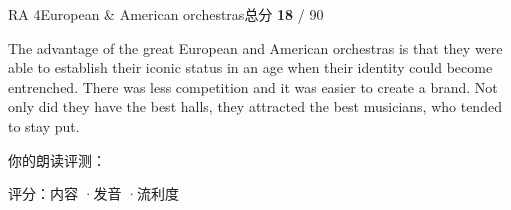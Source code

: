 \begin{qblock}{RA 4\quad European \& American orchestras}{总分 \textcolor{cAccent}{\bfseries 18} / 90}
\begin{promptbox}
The advantage of the great European and American orchestras is that they were able to establish their iconic status in an age when their identity could become entrenched. There was less competition and it was easier to create a brand. Not only did they have the best halls, they attracted the best musicians, who tended to stay put.
\end{promptbox}
\smallskip\par{\footnotesize\color{gray}你的朗读评测：}
\begin{asrbox}
    \pse {}  \pse {}  \pse {} \pse {} \pse {} \pse {} \pse {}   \pse {} \pse {} \pse {}   \pse {}    \pse {}
\end{asrbox}
{\small 评分：内容 \quad·\quad 发音 \quad·\quad 流利度 }
\end{qblock}


